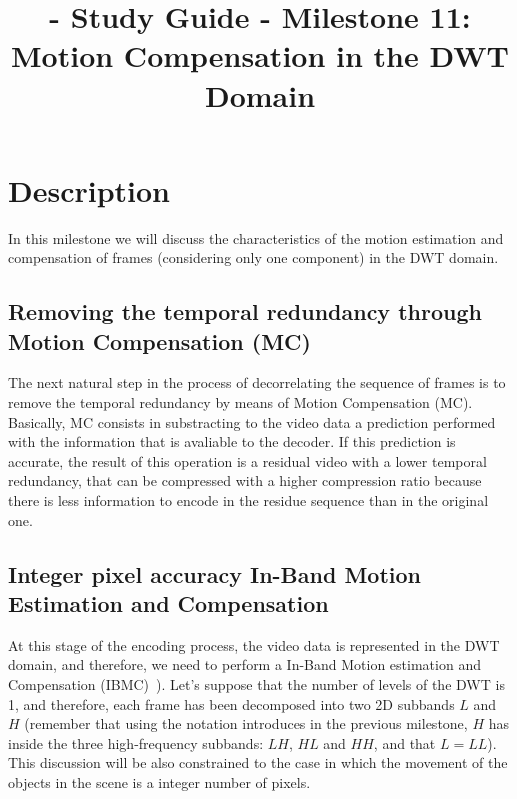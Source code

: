 
\title{\SM{} - Study Guide - Milestone 11: Motion Compensation in the DWT Domain}

\maketitle

\section{Description}

In this milestone we will discuss the characteristics of the motion
estimation and compensation of frames (considering only one component)
in the DWT domain.

\subsection{Removing the temporal redundancy through Motion Compensation (MC)}
The next natural step in the process of decorrelating the sequence of
frames is to remove the temporal redundancy by means of Motion
Compensation (MC). Basically, MC consists in substracting to the video
data a prediction performed with the information that is avaliable to
the decoder. If this prediction is accurate, the result of this
operation is a residual video with a lower temporal redundancy, that
can be compressed with a higher compression ratio because there is
less information to encode in the residue sequence than in the
original one.

\subsection{Integer pixel accuracy In-Band Motion Estimation and Compensation}
At this stage of the encoding process, the video data is represented
in the DWT domain, and therefore, we need to perform a In-Band Motion
estimation and Compensation
(IBMC)~\cite{andreopoulos2005complete}). Let's suppose that the number
of levels of the DWT is 1, and therefore, each frame has been
decomposed into two 2D subbands $L$ and $H$ (remember that using the
notation introduces in the previous milestone, $H$ has inside the
three high-frequency subbands: $LH$, $HL$ and $HH$, and that
$L=LL$). This discussion will be also constrained to the case in which
the movement of the objects in the scene is a integer number of
pixels.

